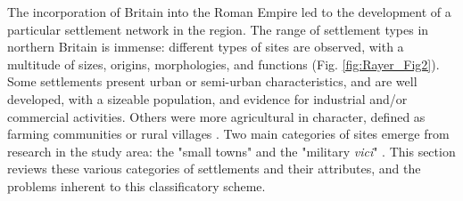 
The incorporation of Britain into the Roman Empire led to the development of a particular settlement network in the region. The range of settlement types in northern Britain is immense: different types of sites are observed, with a multitude of sizes, origins, morphologies, and functions (Fig. \ref{fig:Rayer_Fig2}). Some settlements present urban or semi-urban characteristics, and are well developed, with a sizeable population, and evidence for industrial and/or commercial activities. Others were more agricultural in character, defined as farming communities or rural villages \parencites{Hingley_1989}{James_2001}{Jones_1991}{Wacher_1995}. Two main categories of sites emerge from research in the study area: the "small towns" and the "military \textit{vici}" \parencites{Rodwell_1975}{Sommer_1984}{Sommer_2006}{Wacher_1995}. This section reviews these various categories of settlements and their attributes, and the problems inherent to this classificatory scheme. 


